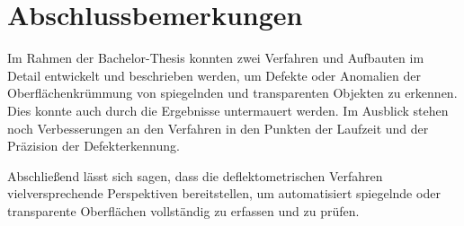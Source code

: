 \documentclass[ngerman,11pt,twocolumn,a4paper]{article}
\begin{document}
	\section{Abschlussbemerkungen} \label{sec:abschlussbemerkungen}
	Im Rahmen der Bachelor-Thesis konnten zwei Verfahren und Aufbauten im Detail entwickelt und beschrieben werden, um Defekte oder Anomalien der Oberflächenkrümmung von spiegelnden und transparenten Objekten zu erkennen.
	Dies konnte auch durch die Ergebnisse untermauert werden.
	Im Ausblick stehen noch Verbesserungen an den Verfahren in den Punkten der Laufzeit und der Präzision der Defekterkennung.
	
	\par
	Abschließend lässt sich sagen, dass die deflektometrischen Verfahren vielversprechende Perspektiven bereitstellen, um automatisiert spiegelnde oder transparente Oberflächen vollständig zu erfassen und zu prüfen.

	\printbibliography[title = Quellenverzeichnis]
\end{document}
